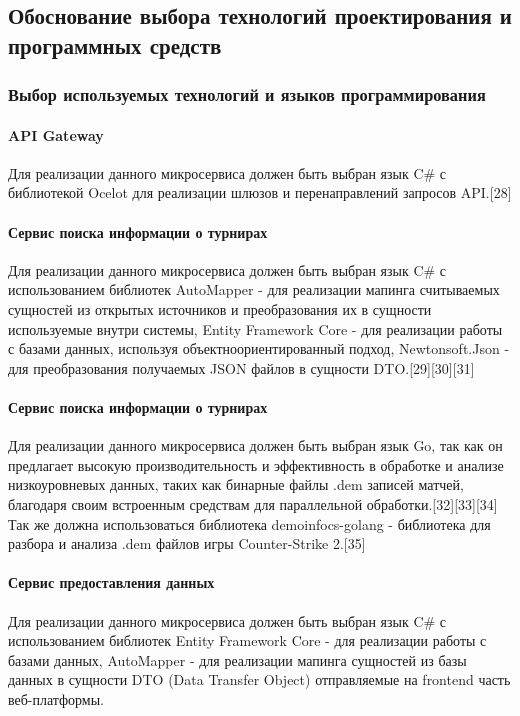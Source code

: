 \subsection{Обоснование выбора технологий проектирования и программных средств}
\subsubsection{Выбор используемых технологий и языков программирования}

\paragraph{API Gateway}

Для реализации данного микросервиса должен быть выбран язык C\# с библиотекой Ocelot для реализации шлюзов и перенаправлений запросов API.[28]

\paragraph{Сервис поиска информации о турнирах}

Для реализации данного микросервиса должен быть выбран язык C\# с использованием библиотек AutoMapper - для реализации мапинга считываемых сущностей из открытых источников и преобразования их в сущности используемые внутри системы, Entity Framework Core - для реализации работы с базами данных, используя объектноориентированный подход, Newtonsoft.Json - для преобразования получаемых JSON файлов в сущности DTO.[29][30][31]

\paragraph{Сервис поиска информации о турнирах}

Для реализации данного микросервиса должен быть выбран язык Go, так как он предлагает высокую производительность и эффективность в обработке и анализе низкоуровневых данных, таких как  бинарные файлы .dem записей матчей, благодаря своим встроенным средствам для параллельной обработки.[32][33][34] Так же должна использоваться библиотека demoinfocs-golang - библиотека для разбора и анализа .dem файлов игры Counter-Strike 2.[35]

\paragraph{Сервис предоставления данных}

Для реализации данного микросервиса должен быть выбран язык C\# с использованием библиотек Entity Framework Core - для реализации работы с базами данных, AutoMapper - для реализации мапинга сущностей из базы данных в сущности DTO (Data Transfer Object) отправляемые на frontend часть веб-платформы.

